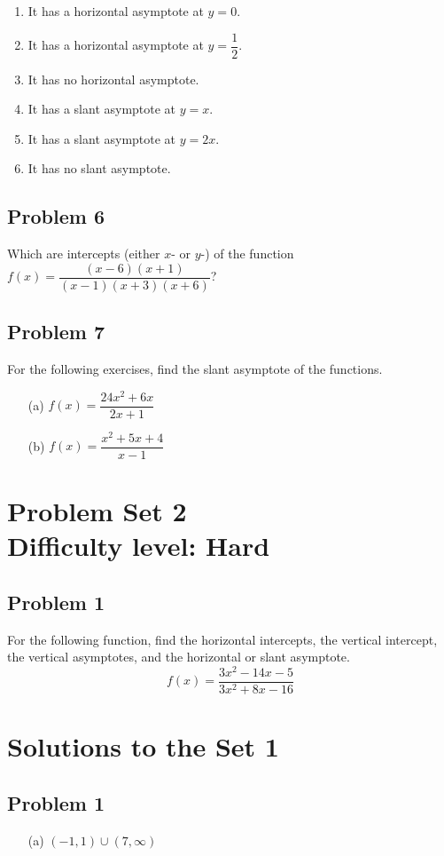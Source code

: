 \documentclass[12pt]{article}
\begin{document}
\begin{enumerate}[label=(\alph*)]
    \item It has a horizontal asymptote at \( y = 0 \).
    \item It has a horizontal asymptote at \( y = \dfrac{1}{2} \).
    \item It has no horizontal asymptote.
    \item It has a slant asymptote at \( y = x \).
    \item It has a slant asymptote at \( y = 2x \).
    \item It has no slant asymptote.
\end{enumerate}

\subsection*{Problem 6}
Which are intercepts (either \(x\)- or \(y\)-) of the function \(f(x)=\dfrac{(x-6)(x+1)}{(x-1)(x+3)(x+6)}\)?

\subsection*{Problem 7}
For the following exercises, find the slant asymptote of the functions.
\begin{enumerate}
    \item[(a)] \(f(x)=\dfrac{24x^2+6x}{2x+1}\)
    \item[(b)] \(f(x)=\dfrac{x^2+5x+4}{x-1}\)
\end{enumerate}

\section*{Problem Set 2\\Difficulty level: Hard}
\subsection*{Problem 1}
For the following function, find the horizontal intercepts, the vertical intercept, the vertical asymptotes, and the horizontal or slant asymptote.
\[f(x)=\dfrac{3x^2-14x-5}{3x^2+8x-16}\]
\newpage
\section*{Solutions to the Set 1}
\subsection*{Problem 1}
\begin{enumerate}
    \item[(a)] \((-1,1) \cup (7,\infty)\) 
\end{enumerate}
\end{document}
